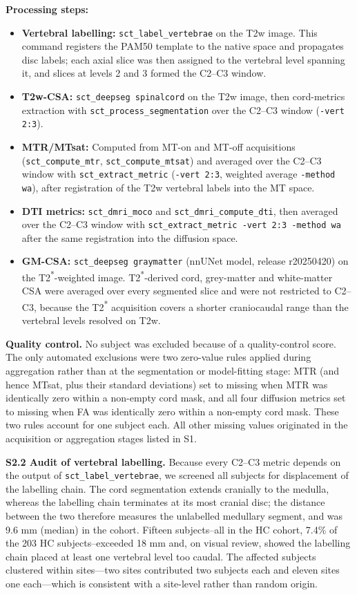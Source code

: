 \documentclass[12pt,a4paper]{article}
\begin{document}
\textbf{Processing steps:}
\begin{itemize}[nosep]
  \item \textbf{Vertebral labelling:} \texttt{sct\_label\_vertebrae} on the T2w image. This command registers the PAM50 template to the native space and propagates disc labels; each axial slice was then assigned to the vertebral level spanning it, and slices at levels 2 and 3 formed the C2--C3 window.
  \item \textbf{T2w-CSA:} \texttt{sct\_deepseg spinalcord} on the T2w image, then cord-metrics extraction with \texttt{sct\_process\_segmentation} over the C2--C3 window (\texttt{-vert 2:3}).
  \item \textbf{MTR/MTsat:} Computed from MT-on and MT-off acquisitions (\texttt{sct\_compute\_mtr}, \texttt{sct\_compute\_mtsat}) and averaged over the C2--C3 window with \texttt{sct\_extract\_metric} (\texttt{-vert 2:3}, weighted average \texttt{-method wa}), after registration of the T2w vertebral labels into the MT space.
  \item \textbf{DTI metrics:} \texttt{sct\_dmri\_moco} and \texttt{sct\_dmri\_compute\_dti}, then averaged over the C2--C3 window with \texttt{sct\_extract\_metric -vert 2:3 -method wa} after the same registration into the diffusion space.
  \item \textbf{GM-CSA:} \texttt{sct\_deepseg graymatter} (nnUNet model, release r20250420) on the T2\textsuperscript{*}-weighted image. T2\textsuperscript{*}-derived cord, grey-matter and white-matter CSA were averaged over every segmented slice and were not restricted to C2--C3, because the T2\textsuperscript{*} acquisition covers a shorter craniocaudal range than the vertebral levels resolved on T2w.
\end{itemize}

\textbf{Quality control.} No subject was excluded because of a quality-control score. The only automated exclusions were two zero-value rules applied during aggregation rather than at the segmentation or model-fitting stage: MTR (and hence MTsat, plus their standard deviations) set to missing when MTR was identically zero within a non-empty cord mask, and all four diffusion metrics set to missing when FA was identically zero within a non-empty cord mask. These two rules account for one subject each. All other missing values originated in the acquisition or aggregation stages listed in S1.

\textbf{S2.2 Audit of vertebral labelling.} Because every C2--C3 metric depends on the output of \texttt{sct\_label\_vertebrae}, we screened all subjects for displacement of the labelling chain. The cord segmentation extends cranially to the medulla, whereas the labelling chain terminates at its most cranial disc; the distance between the two therefore measures the unlabelled medullary segment, and was 9.6 mm (median) in the cohort. Fifteen subjects--all in the HC cohort, 7.4\% of the 203 HC subjects--exceeded 18 mm and, on visual review, showed the labelling chain placed at least one vertebral level too caudal. The affected subjects clustered within sites---two sites contributed two subjects each and eleven sites one each---which is consistent with a site-level rather than random origin.
\end{document}
